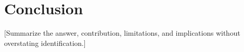 \section{Conclusion}

[Summarize the answer, contribution, limitations, and implications without overstating identification.]
